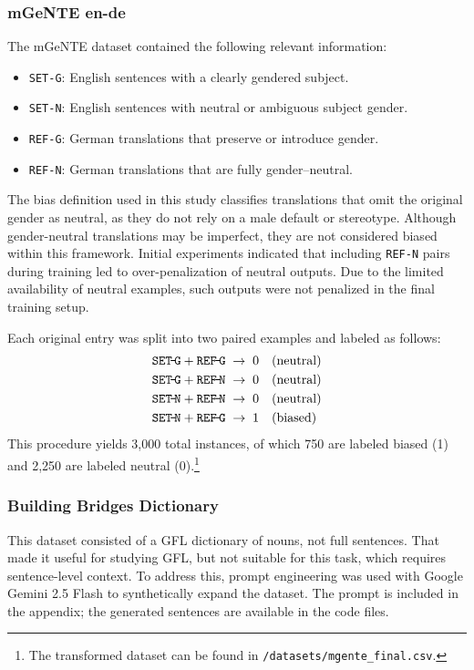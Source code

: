 \subsubsection{mGeNTE en-de} The mGeNTE dataset contained the following relevant information:  

\begin{itemize}  
  \item \texttt{SET-G}: English sentences with a clearly gendered subject.  
  \item \texttt{SET-N}: English sentences with neutral or ambiguous subject gender.  
  \item \texttt{REF-G}: German translations that preserve or introduce gender.  
  \item \texttt{REF-N}: German translations that are fully gender–neutral.  
\end{itemize}  

\noindent
The bias definition used in this study classifies translations that omit the original gender as neutral, as they do not rely on a male default or stereotype. Although gender-neutral translations may be imperfect, they are not considered biased within this framework. Initial experiments indicated that including \texttt{REF-N} pairs during training led to over-penalization of neutral outputs. Due to the limited availability of neutral examples, such outputs were not penalized in the final training setup.

Each original entry was split into two paired examples and labeled as follows:  
\[
\begin{aligned}
\texttt{SET\!-\!G} + \texttt{REF\!-\!G} &\;\rightarrow\; 0 \quad(\text{neutral})\\
\texttt{SET\!-\!G} + \texttt{REF\!-\!N} &\;\rightarrow\; 0 \quad(\text{neutral})\\
\texttt{SET\!-\!N} + \texttt{REF\!-\!N} &\;\rightarrow\; 0 \quad(\text{neutral})\\
\texttt{SET\!-\!N} + \texttt{REF\!-\!G} &\;\rightarrow\; 1 \quad(\text{biased})
\end{aligned}
\]  
This procedure yields 3,000 total instances, of which 750 are labeled biased (1) and 2,250 are labeled neutral (0).\footnote{The transformed dataset can be found in \texttt{/datasets/mgente\_final.csv}.} 

\subsubsection{Building Bridges Dictionary} 
This dataset consisted of a GFL dictionary of nouns, not full sentences. That made it useful for studying GFL, but not suitable for this task, which requires sentence-level context. To address this, prompt engineering was used with Google Gemini 2.5 Flash to synthetically expand the dataset. The prompt is included in the appendix; the generated sentences are available in the code files.

